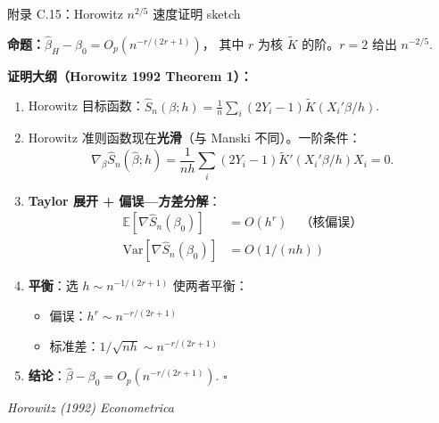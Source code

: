 \documentclass[aspectratio=169, 10pt]{beamer}
\begin{document}
\begin{frame}{附录 C.15：Horowitz $n^{2/5}$ 速度证明 sketch}
  \hypertarget{proof-c15}{}

  \textbf{命题：}$\hat\beta_H - \beta_0 = O_p(n^{-r/(2r+1)})$，
  其中 $r$ 为核 $\tilde K$ 的阶。$r = 2$ 给出 $n^{-2/5}$.

  \textbf{证明大纲（Horowitz 1992 Theorem 1）：}
  \begin{enumerate}\setlength{\itemsep}{1pt}
    \item Horowitz 目标函数：$\hat S_n(\beta; h) = \frac{1}{n}\sum_i (2Y_i-1) \tilde K(X_i'\beta/h)$.

    \item Horowitz 准则函数现在\textbf{光滑}（与 Manski 不同）。一阶条件：
    $$\nabla_\beta \hat S_n(\hat\beta; h) = \frac{1}{nh}\sum_i (2Y_i-1) \tilde K'(X_i'\beta/h) X_i = 0.$$

    \item \textbf{Taylor 展开 + 偏误—方差分解}：
    \begin{align*}
    \mathbb{E}[\nabla \hat S_n(\beta_0)] &= O(h^r) \quad \text{（核偏误）}\\
    \text{Var}[\nabla \hat S_n(\beta_0)] &= O(1/(nh))
    \end{align*}

    \item \textbf{平衡}：选 $h \sim n^{-1/(2r+1)}$ 使两者平衡：
    \begin{itemize}\setlength{\itemsep}{1pt}
      \item 偏误：$h^r \sim n^{-r/(2r+1)}$
      \item 标准差：$1/\sqrt{nh} \sim n^{-r/(2r+1)}$
    \end{itemize}

    \item \textbf{结论}：$\hat\beta - \beta_0 = O_p(n^{-r/(2r+1)})$. $\square$
  \end{enumerate}

  \hfill{\scriptsize\textit{Horowitz (1992) Econometrica}}
  \hfill{\scriptsize\hyperlink{main-c15}{}}

\end{frame}
\end{document}
